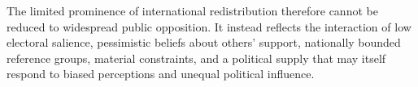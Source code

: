 The limited prominence of international redistribution therefore cannot be reduced to widespread public opposition. %
It instead reflects the interaction of low electoral salience, pessimistic beliefs about others' support, nationally bounded reference groups, material constraints, and a political supply that may itself respond to biased perceptions and unequal political influence.

